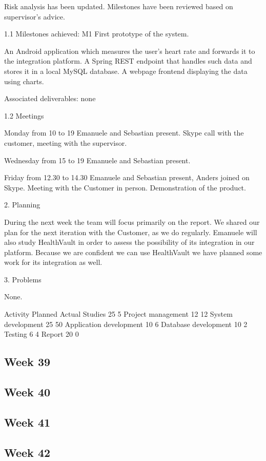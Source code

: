 Risk analysis has been updated. Milestones have been reviewed based on supervisor’s advice.

1.1 Milestones achieved: M1 First prototype of the system.

An Android application which measures the user’s heart rate and forwards it to the integration platform.
A Spring REST endpoint that handles such data and stores it in a local MySQL database.
A webpage frontend displaying the data using charts.

Associated deliverables: none

1.2 Meetings

Monday from 10 to 19
Emanuele and Sebastian present.
Skype call with the customer, meeting with the supervisor.

Wednesday from 15 to 19
Emanuele and Sebastian present.

Friday from 12.30 to 14.30
Emanuele and Sebastian present, Anders joined on Skype.
Meeting with the Customer in person. Demonstration of the product.

2. Planning

During the next week the team will focus primarily on the report.
We shared our plan for the next iteration with the Customer, as we do regularly. Emanuele will also study HealthVault in order to assess the possibility of its integration in our platform. Because we are confident we can use HealthVault  we have planned some work for its integration as well.

3. Problems

None.

Activity
Planned
Actual
Studies
25
5
Project management
12
12
System development
25
50
Application development
10
6
Database development
10
2
Testing
6
4
Report
20
0




\subsection{Week 39}

\subsection{Week 40}

\subsection{Week 41}

\subsection{Week 42}

